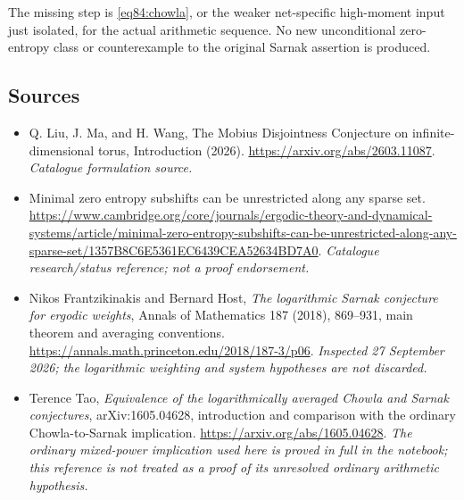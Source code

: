 \documentclass[11pt,a4paper]{article}
\numberwithin{equation}{section}
\begin{document}
The missing step is \eqref{eq84:chowla}, or the weaker net-specific
high-moment input just isolated, for the actual arithmetic sequence.
No new unconditional zero-entropy class or counterexample to the original
Sarnak assertion is produced.

\needspace{170mm}
\subsection{Sources}
\begin{itemize}\raggedright
\item[\textnormal{[S1]}]\hypertarget{source:84:1}{} Q. Liu, J. Ma, and H. Wang, The Mobius Disjointness Conjecture on infinite-dimensional torus, Introduction (2026).
\url{https://arxiv.org/abs/2603.11087}.
{\small\textit{Catalogue formulation source.}}
\item[\textnormal{[S2]}]\hypertarget{source:84:2}{} Minimal zero entropy subshifts can be unrestricted along any sparse set.
\url{https://www.cambridge.org/core/journals/ergodic-theory-and-dynamical-systems/article/minimal-zero-entropy-subshifts-can-be-unrestricted-along-any-sparse-set/1357B8C6E5361EC6439CEA52634BD7A0}.
{\small\textit{Catalogue research/status reference; not a proof endorsement.}}
\item[\textnormal{[E1]}]\hypertarget{extra:84:1}{} Nikos Frantzikinakis
and Bernard Host, \emph{The logarithmic Sarnak conjecture for ergodic weights},
Annals of Mathematics 187 (2018), 869--931, main theorem and averaging
conventions.
\url{https://annals.math.princeton.edu/2018/187-3/p06}.
{\small\textit{Inspected 27 September 2026; the logarithmic weighting and
system hypotheses are not discarded.}}
\item[\textnormal{[E2]}]\hypertarget{extra:84:2}{} Terence Tao,
\emph{Equivalence of the logarithmically averaged Chowla and Sarnak
conjectures}, arXiv:1605.04628, introduction and comparison with the
ordinary Chowla-to-Sarnak implication.
\url{https://arxiv.org/abs/1605.04628}.
{\small\textit{The ordinary mixed-power implication used here is proved
in full in the notebook; this reference is not treated as a proof of its
unresolved ordinary arithmetic hypothesis.}}
\end{itemize}
\end{document}
